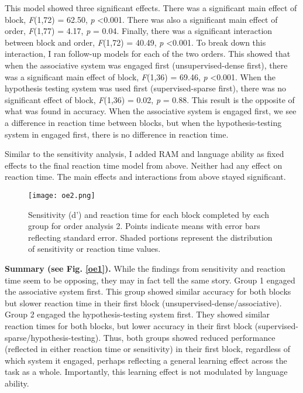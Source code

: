\documentclass[../dissertation.tex]{subfiles}
\begin{document}
	This model showed three significant effects. There was a significant main effect of block, \textit{F}(1,72) = 62.50, \textit{p} \textless 0.001. There was also a significant main effect of order, \textit{F}(1,77) = 4.17, \textit{p} = 0.04. Finally, there was a significant interaction between block and order, \textit{F}(1,72) = 40.49, \textit{p} \textless 0.001. To break down this interaction, I ran follow-up models for each of the two orders. This showed that when the associative system was engaged first (unsupervised-dense first), there was a significant main effect of block, \textit{F}(1,36) = 69.46, \textit{p} \textless 0.001. When the hypothesis testing system was used first (supervised-sparse first), there was no significant effect of block, \textit{F}(1,36) = 0.02, \textit{p} = 0.88. This result is the opposite of what was found in accuracy. When the associative system is engaged first, we see a difference in reaction time between blocks, but when the hypothesis-testing system in engaged first, there is no difference in reaction time. \par
	Similar to the sensitivity analysis, I added RAM and language ability as fixed effects to the final reaction time model from above. Neither had any effect on reaction time. The main effects and interactions from above stayed significant. \par 
	
\begin{wrapfigure}{R}{0.55\textwidth}
\vspace{-10pt}
\texttt{[image: oe2.png]}
\caption[Sensitivity and reaction time for order analysis 2]{Sensitivity (d')  and reaction time for each block completed by each group for order analysis 2. Points indicate means with error bars reflecting standard error. Shaded portions represent the distribution of sensitivity or reaction time values.}
\label{oe2}
\vspace{-20pt}
\end{wrapfigure}	

	\textbf{Summary (see Fig. \ref{oe1}).} While the findings from sensitivity and reaction time seem to be opposing, they may in fact tell the same story. Group 1 engaged the associative system first. This group showed similar accuracy for both blocks but slower reaction time in their first block (unsupervised-dense/associative). Group 2 engaged the hypothesis-testing system first. They showed similar reaction times for both blocks, but lower accuracy in their first block (supervised-sparse/hypothesis-testing). Thus, both groups showed reduced performance (reflected in either reaction time or sensitivity) in their first block, regardless of which system it engaged, perhaps reflecting a general learning effect across the task as a whole. Importantly, this learning effect is not modulated by language ability.
\end{document}

